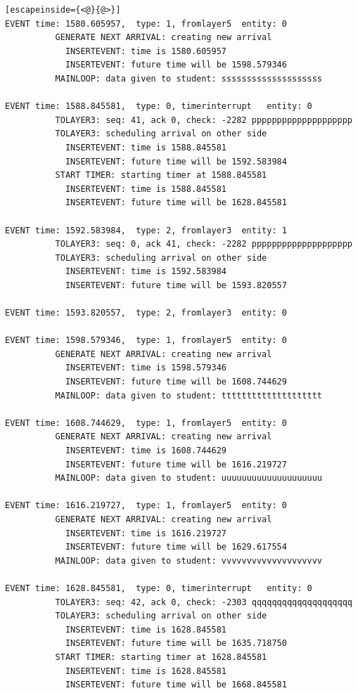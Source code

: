 \documentclass[paper=a4, fontsize=11pt]{scrartcl}
\numberwithin{equation}{section}		%
\numberwithin{figure}{section}			%
\numberwithin{table}{section}				%
\begin{document}
\begin{lstlisting}[escapeinside={<@}{@>}]
EVENT time: 1580.605957,  type: 1, fromlayer5  entity: 0
          GENERATE NEXT ARRIVAL: creating new arrival
            INSERTEVENT: time is 1580.605957
            INSERTEVENT: future time will be 1598.579346
          MAINLOOP: data given to student: ssssssssssssssssssss

EVENT time: 1588.845581,  type: 0, timerinterrupt   entity: 0
          TOLAYER3: seq: 41, ack 0, check: -2282 pppppppppppppppppppp
          TOLAYER3: scheduling arrival on other side
            INSERTEVENT: time is 1588.845581
            INSERTEVENT: future time will be 1592.583984
          START TIMER: starting timer at 1588.845581
            INSERTEVENT: time is 1588.845581
            INSERTEVENT: future time will be 1628.845581

EVENT time: 1592.583984,  type: 2, fromlayer3  entity: 1
          TOLAYER3: seq: 0, ack 41, check: -2282 pppppppppppppppppppp
          TOLAYER3: scheduling arrival on other side
            INSERTEVENT: time is 1592.583984
            INSERTEVENT: future time will be 1593.820557

EVENT time: 1593.820557,  type: 2, fromlayer3  entity: 0

EVENT time: 1598.579346,  type: 1, fromlayer5  entity: 0
          GENERATE NEXT ARRIVAL: creating new arrival
            INSERTEVENT: time is 1598.579346
            INSERTEVENT: future time will be 1608.744629
          MAINLOOP: data given to student: tttttttttttttttttttt

EVENT time: 1608.744629,  type: 1, fromlayer5  entity: 0
          GENERATE NEXT ARRIVAL: creating new arrival
            INSERTEVENT: time is 1608.744629
            INSERTEVENT: future time will be 1616.219727
          MAINLOOP: data given to student: uuuuuuuuuuuuuuuuuuuu

EVENT time: 1616.219727,  type: 1, fromlayer5  entity: 0
          GENERATE NEXT ARRIVAL: creating new arrival
            INSERTEVENT: time is 1616.219727
            INSERTEVENT: future time will be 1629.617554
          MAINLOOP: data given to student: vvvvvvvvvvvvvvvvvvvv

EVENT time: 1628.845581,  type: 0, timerinterrupt   entity: 0
          TOLAYER3: seq: 42, ack 0, check: -2303 qqqqqqqqqqqqqqqqqqqq
          TOLAYER3: scheduling arrival on other side
            INSERTEVENT: time is 1628.845581
            INSERTEVENT: future time will be 1635.718750
          START TIMER: starting timer at 1628.845581
            INSERTEVENT: time is 1628.845581
            INSERTEVENT: future time will be 1668.845581


\end{lstlisting}
\end{document}
